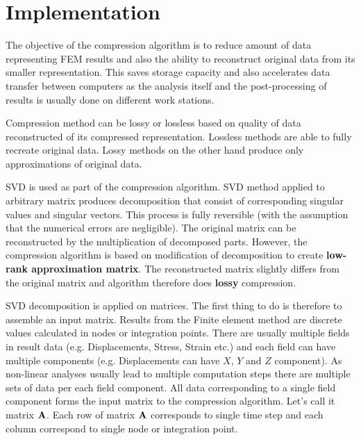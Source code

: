 \section{Implementation}
\label{sec:implementation}


The objective of the compression algorithm is to reduce amount of data representing FEM results and also the ability to reconstruct original data from its smaller representation. This saves storage capacity and also accelerates data transfer between computers as the analysis itself and the post-processing of results is usually done on different work stations.

Compression method can be lossy or lossless based on quality of data reconstructed of its compressed representation. Lossless methods are able to fully recreate original data. Lossy methods on the other hand produce only approximations of original data. 

SVD is used as part of the compression algorithm. SVD method applied to arbitrary matrix produces decomposition that consist of corresponding singular values and singular vectors. This process is fully reversible (with the assumption that the numerical errors are negligible). The original matrix can be reconstructed by the multiplication of decomposed parts. However, the compression algorithm is based on modification of decomposition to create \textbf{low-rank approximation matrix}. The reconstructed matrix slightly differs from the original matrix and algorithm therefore does \textbf{lossy} compression.


SVD decomposition is applied on matrices. The first thing to do is therefore to assemble an input matrix. Results from the Finite element method are discrete values calculated in nodes or integration points. There are usually multiple fields in result data (e.g. Displacements, Stress, Strain etc.) and each field can have multiple components (e.g. Displacements can have $X$, $Y$ and $Z$ component). As non-linear analyses usually lead to multiple computation steps there are multiple sets of data per each field component. All data corresponding to a single field component forms the input matrix to the compression algorithm. Let's call it matrix $\mathbf{A}$. Each row of matrix $\mathbf{A}$ corresponds to single time step and each column correspond to single node or integration point.


